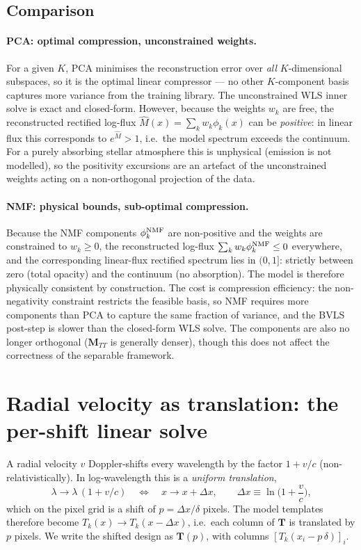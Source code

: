 \documentclass[11pt]{article}
\newcommand{\dx}{\Delta x}                     %
\begin{document}
\subsection*{Comparison}

\paragraph{PCA: optimal compression, unconstrained weights.}
For a given $K$, PCA minimises the reconstruction error over \emph{all}
$K$-dimensional subspaces, so it is the optimal linear compressor --- no other
$K$-component basis captures more variance from the training library. The
unconstrained WLS inner solve is exact and closed-form. However, because the
weights $w_k$ are free, the reconstructed rectified log-flux
$\hat{M}(x) = \sum_k w_k\phi_k(x)$ can be \emph{positive}: in linear flux this
corresponds to $e^{\hat{M}} > 1$, i.e.\ the model spectrum exceeds the continuum.
For a purely absorbing stellar atmosphere this is unphysical (emission is not
modelled), so the positivity excursions are an artefact of the unconstrained
weights acting on a non-orthogonal projection of the data.

\paragraph{NMF: physical bounds, sub-optimal compression.}
Because the NMF components $\phi_k^{\rm NMF}$ are non-positive and the weights are
constrained to $w_k \geq 0$, the reconstructed log-flux
$\sum_k w_k\phi_k^{\rm NMF} \leq 0$ everywhere, and the corresponding linear-flux
rectified spectrum lies in $(0,1]$: strictly between zero (total opacity) and the
continuum (no absorption). The model is therefore physically consistent by
construction. The cost is compression efficiency: the non-negativity constraint
restricts the feasible basis, so NMF requires more components than PCA to capture
the same fraction of variance, and the BVLS post-step is slower than the
closed-form WLS solve. The components are also no longer orthogonal
($\mathbf{M}_{TT}$ is generally denser), though this does not affect the
correctness of the separable framework.

\section{Radial velocity as translation: the per-shift linear solve}
\label{sec:rv}
A radial velocity $v$ Doppler-shifts every wavelength by the factor $1+v/c$
(non-relativistically). In log-wavelength this is a \emph{uniform translation},
\begin{equation}
  \lambda \to \lambda\,(1+v/c)
  \quad\Longleftrightarrow\quad
  x \to x + \dx,\qquad \dx \equiv \ln\!\Big(1+\frac{v}{c}\Big),
\end{equation}
which on the pixel grid is a shift of $p=\dx/\delta$ pixels. The model templates
therefore become $T_k(x)\to T_k(x-\dx)$, i.e.\ each column of $\mathbf{T}$ is
translated by $p$ pixels. We write the shifted design as $\mathbf{T}(p)$, with
columns $[T_k(x_i - p\,\delta)]_i$.
\end{document}
